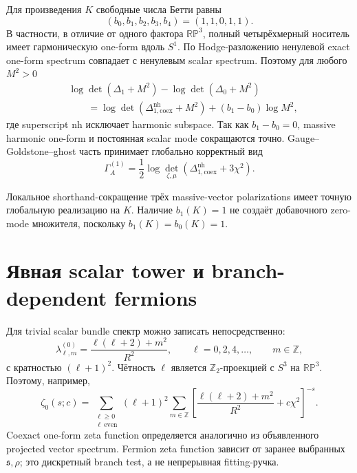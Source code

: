 Для произведения \(K\) свободные числа Бетти равны
\begin{equation}
 (b_0,b_1,b_2,b_3,b_4)=(1,1,0,1,1).
\end{equation}
В частности, в отличие от одного фактора \(\mathbb{RP}^3\), полный
четырёхмерный носитель имеет гармоническую one-form вдоль \(S^1\).
По Hodge-разложению ненулевой exact one-form spectrum совпадает с
ненулевым scalar spectrum. Поэтому для любого \(M^2>0\)
\begin{align}
 &\log\det(\Delta_1+M^2)-\log\det(\Delta_0+M^2)
 \\
 &\qquad=
 \log\det(\Delta_{1,\mathrm{coex}}^{\mathrm{nh}}+M^2)
 +(b_1-b_0)\log M^2,
\end{align}
где superscript \(\mathrm{nh}\) исключает harmonic subspace. Так как
\(b_1-b_0=0\), massive harmonic one-form и постоянная scalar mode
сокращаются точно. Gauge--Goldstone--ghost часть принимает глобально
корректный вид
\begin{equation}
 \Gamma_A^{(1)}
 =\frac12\log\det_{\zeta,\mu}
 (\Delta_{1,\mathrm{coex}}^{\mathrm{nh}}+3\chi^2).
\end{equation}

\begin{proposition}
Локальное shorthand-сокращение трёх massive-vector polarizations имеет
точную глобальную реализацию на \(K\). Наличие \(b_1(K)=1\) не создаёт
добавочного zero-mode множителя, поскольку \(b_1(K)=b_0(K)=1\).
\end{proposition}

\section{Явная scalar tower и branch-dependent fermions}

Для trivial scalar bundle спектр можно записать непосредственно:
\begin{equation}
 \lambda_{\ell,m}^{(0)}
 =\frac{\ell(\ell+2)+m^2}{R^2},
 \qquad
 \ell=0,2,4,\ldots,
 \qquad
 m\in\mathbb Z,
\end{equation}
с кратностью \((\ell+1)^2\). Чётность \(\ell\) является
\(\mathbb Z_2\)-проекцией с \(S^3\) на \(\mathbb{RP}^3\). Поэтому,
например,
\begin{equation}
 \zeta_0(s;c)
 =\sum_{\substack{\ell\ge0\\ \ell\ \mathrm{even}}}
 (\ell+1)^2
 \sum_{m\in\mathbb Z}
 \left[
 \frac{\ell(\ell+2)+m^2}{R^2}+c\chi^2
 \right]^{-s}.
\end{equation}
Coexact one-form zeta function определяется аналогично из объявленного
projected vector spectrum. Fermion zeta function зависит от заранее
выбранных \(\mathfrak s,\rho\); это дискретный branch test, а не
непрерывная fitting-ручка.


